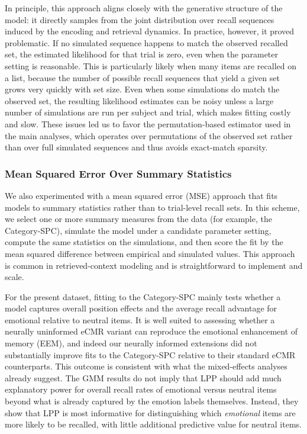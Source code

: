 \documentclass[
  man,
  longtable,
  nolmodern,
  notxfonts,
  notimes,
  draftfirst,
  colorlinks=true,linkcolor=blue,citecolor=blue,urlcolor=blue]{apa7}
\begin{document}
In principle, this approach aligns closely with the generative structure
of the model: it directly samples from the joint distribution over
recall sequences induced by the encoding and retrieval dynamics. In
practice, however, it proved problematic. If no simulated sequence
happens to match the observed recalled set, the estimated likelihood for
that trial is zero, even when the parameter setting is reasonable. This
is particularly likely when many items are recalled on a list, because
the number of possible recall sequences that yield a given set grows
very quickly with set size. Even when some simulations do match the
observed set, the resulting likelihood estimates can be noisy unless a
large number of simulations are run per subject and trial, which makes
fitting costly and slow. These issues led us to favor the
permutation-based estimator used in the main analyses, which operates
over permutations of the observed set rather than over full simulated
sequences and thus avoids exact-match sparsity.

\subsubsection{Mean Squared Error Over Summary
Statistics}\label{mean-squared-error-over-summary-statistics}

We also experimented with a mean squared error (MSE) approach that fits
models to summary statistics rather than to trial-level recall sets. In
this scheme, we select one or more summary measures from the data (for
example, the Category-SPC), simulate the model under a candidate
parameter setting, compute the same statistics on the simulations, and
then score the fit by the mean squared difference between empirical and
simulated values. This approach is common in retrieved-context modeling
and is straightforward to implement and scale.

For the present dataset, fitting to the Category-SPC mainly tests
whether a model captures overall position effects and the average recall
advantage for emotional relative to neutral items. It is well suited to
assessing whether a neurally uninformed eCMR variant can reproduce the
emotional enhancement of memory (EEM), and indeed our neurally informed
extensions did not substantially improve fits to the Category-SPC
relative to their standard eCMR counterparts. This outcome is consistent
with what the mixed-effects analyses already suggest. The GMM results do
not imply that LPP should add much explanatory power for overall recall
rates of emotional versus neutral items beyond what is already captured
by the emotion labels themselves. Instead, they show that LPP is most
informative for distinguishing which \emph{emotional} items are more
likely to be recalled, with little additional predictive value for
neutral items.
\end{document}

